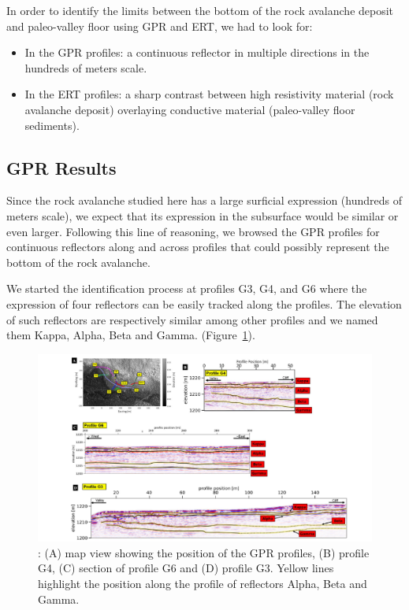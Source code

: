 \documentclass[5p]{elsarticle}
\begin{document}
In order to identify the limits between the bottom of the rock avalanche deposit and paleo-valley floor using GPR and ERT, we had to look for:

\begin{itemize}
    \item In the GPR profiles: a continuous reflector in multiple directions in the hundreds of meters scale.
    \item In the ERT profiles: a sharp contrast between high resistivity material (rock avalanche deposit) overlaying conductive material (paleo-valley floor sediments).
\end{itemize}


		\subsection {GPR Results}
										
Since the rock avalanche studied here has a large surficial expression (hundreds of meters scale), we expect that its expression in the subsurface would be similar or even larger. Following this line of reasoning, we browsed the GPR profiles for continuous reflectors along and across profiles that could possibly represent the bottom of the rock avalanche. 

We started the identification process at profiles G3,  G4, and G6 where the expression of four reflectors can be easily tracked along the profiles. The elevation of such reflectors are respectively similar among other profiles and we named them Kappa, Alpha, Beta and Gamma. (Figure~\ref{Profiles_G3_G4_G6}). 

								 \begin{figure}[h]

	\includegraphics[width=\textwidth]{Figures/Profiles_G3_G4_G6.pdf}
		\caption{: (A) map view showing the position of the GPR profiles, (B) profile G4, (C) section of profile G6 and (D) profile G3. Yellow lines highlight the position along the profile of reflectors Alpha, Beta and Gamma. \label{Profiles_G3_G4_G6}}

								   \end{figure}
								   
\end{document}
